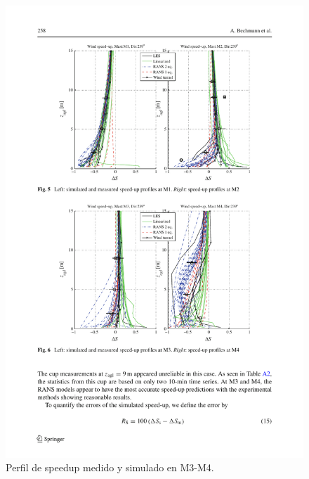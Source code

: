 \documentclass[mathserif,10pt]{beamer}
\begin{document}
\begin{frame}{}
	\begin{figure}[H]
		\centering
		\includegraphics[width=1.0\linewidth,trim={2.7cm 6.0cm 1.9cm 10.3cm},clip]{fig/an1/bolund3.pdf}%
		\caption{Perfil de speedup medido y simulado en M3-M4.}
		\label{fig:an1_speed_masts2}
	\end{figure}
\end{frame}
\end{document}
